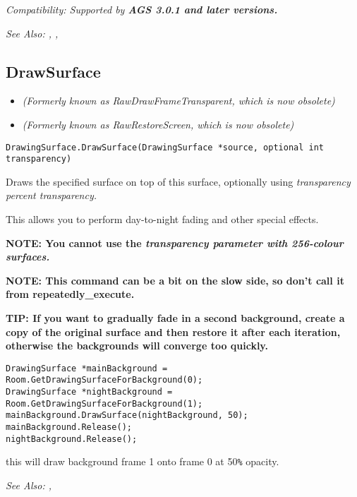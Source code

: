 \it{Compatibility:} Supported by \bf{AGS 3.0.1} and later versions.

\it{See Also:} ,
,


\subsection{DrawSurface}\label{DrawingSurface.DrawSurface}%

\begin{itemize}
\item \it{(Formerly known as RawDrawFrameTransparent, which is now obsolete)}
\item \it{(Formerly known as RawRestoreScreen, which is now obsolete)}
\end{itemize}

\begin{verbatim}
DrawingSurface.DrawSurface(DrawingSurface *source, optional int transparency)
\end{verbatim}
Draws the specified surface on top of this surface, optionally using \it{transparency}
percent transparency.

This allows you to perform day-to-night fading and other special effects.

\bf{NOTE:} You cannot use the \it{transparency} parameter with 256-colour surfaces.

\bf{NOTE:} This command can be a bit on the slow side, so don't call it from repeatedly_execute.

\bf{TIP:} If you want to gradually fade in a second background, create a copy of
the original surface and then restore it after each iteration, otherwise the backgrounds
will converge too quickly.

\begin{verbatim}
DrawingSurface *mainBackground = Room.GetDrawingSurfaceForBackground(0);
DrawingSurface *nightBackground = Room.GetDrawingSurfaceForBackground(1);
mainBackground.DrawSurface(nightBackground, 50);
mainBackground.Release();
nightBackground.Release();
\end{verbatim}
this will draw background frame 1 onto frame 0 at 50\verb$%$ opacity.

\it{See Also:} ,


